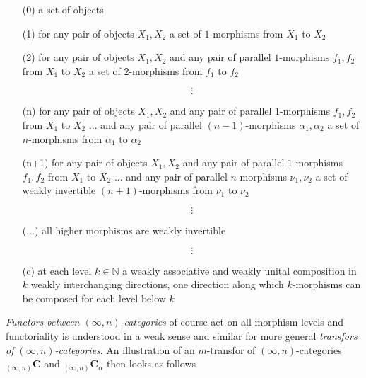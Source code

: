 \begin{enumerate}
\item[(0)]
a set of objects

\item[(1)]
for any pair of objects $X_{1},X_{2}$ a set of $1$-morphisms from $X_{1}$ to $X_{2}$

\item[(2)]
for any pair of objects $X_{1},X_{2}$ and any pair of parallel $1$-morphisms $f_{1},f_{2}$ from $X_{1}$ to $X_{2}$ a set of $2$-morphisms from $f_{1}$ to $f_{2}$

\item[]
\begin{equation*}
\vdots
\end{equation*}
\item[]

\item[(n)]
for any pair of objects $X_{1},X_{2}$ and any pair of parallel $1$-morphisms $f_{1},f_{2}$ from $X_{1}$ to $X_{2}$ ... and any pair of parallel $(n-1)$-morphisms $\alpha_{1},\alpha_{2}$ a set of $n$-morphisms from $\alpha_{1}$ to $\alpha_{2}$

\item[(n+1)]
for any pair of objects $X_{1},X_{2}$ and any pair of parallel $1$-morphisms $f_{1},f_{2}$ from $X_{1}$ to $X_{2}$ ... and any pair of parallel $n$-morphisms $\nu_{1},\nu_{2}$ a set of weakly invertible $(n+1)$-morphisms from $\nu_{1}$ to $\nu_{2}$

\item[]
\begin{equation*}
\vdots
\end{equation*}
\item[]

\item[(...)]
all higher morphisms are weakly invertible

\item[]
\begin{equation*}
\vdots
\end{equation*}
\item[]

\item[(c)]
at each level $k \in \mathbb{N}$ a weakly associative and weakly unital composition in $k$ weakly interchanging directions, one direction along which $k$-morphisms can be composed for each level below $k$
\end{enumerate}
\textit{Functors between $(\infty,n)$-categories} of course act on all morphism levels and functoriality is understood in a weak sense and similar for more general \textit{transfors of $(\infty,n)$-categories}. An illustration of an $m$-transfor of $(\infty,n)$-categories ${_{(\infty,n)}}\mathbf{C}$ and ${_{(\infty,n)}}\mathbf{C}_{\alpha}$ then looks as follows
